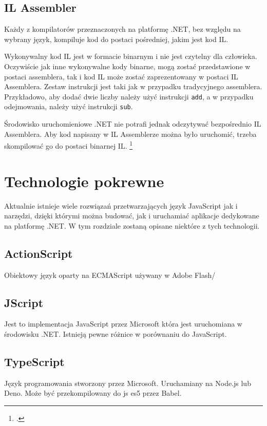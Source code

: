 \subsection{IL Assembler}
\par Każdy z kompilatorów przeznaczonych na platformę .NET, bez względu na wybrany język, kompiluje kod do postaci pośredniej, jakim jest kod IL.
\par Wykonywalny kod IL jest w formacie binarnym i nie jest czytelny dla człowieka. Oczywiście jak inne wykonywalne kody binarne, mogą zostać przedstawione w postaci assemblera, tak i kod IL może zostać zaprezentowany w postaci IL Assemblera. Zestaw instrukcji jest taki jak w przypadku tradycyjnego assemblera. Przykładowo, aby dodać dwie liczby należy użyć instrukcji \texttt{add}, a w przypadku odejmowania, należy użyć instrukcji \texttt{sub}.
\par Środowisko uruchomieniowe .NET nie potrafi jednak odczytywać bezpośrednio IL Assemblera. Aby kod napisany w IL Assemblerze można było uruchomić, trzeba skompilować go do postaci binarnej IL. \footcite{ILAsm1}

\section{Technologie pokrewne}
Aktualnie istnieje wiele rozwiązań przetwarzających język JavaScript jak i narzędzi, dzięki którymi można budować, jak i uruchamiać aplikacje dedykowane na platformę .NET. W tym rozdziale zostaną opisane niektóre z tych technologii.


\subsection{ActionScript}
Obiektowy język oparty na ECMAScript używany w Adobe Flash/

\subsection{JScript}
Jest to implementacja JavaScript przez Microsoft która jest uruchomiana w środowisku .NET.
Istnieją pewne różnice w porównaniu do JavaScript.

\subsection{TypeScript}
Język programowania stworzony przez Microsoft. Uruchamiany na Node.js lub Deno. Może być przekompilowany do js es5 przez Babel.

